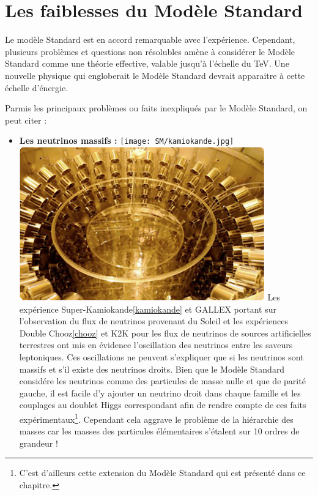 \section{Les faiblesses du Modèle Standard}
Le modèle Standard est en accord remarquable avec l'expérience. Cependant, plusieurs problèmes et questions non résolubles amène à considérer le Modèle Standard comme une théorie effective, valable jusqu'à l'échelle du TeV. Une nouvelle physique qui engloberait le Modèle Standard devrait apparaitre à cette échelle d'énergie.

Parmis les principaux problèmes ou faits inexpliqués par le Modèle Standard, on peut citer :
\begin{itemize}[label=$\bullet$]
\item \textbf{Les neutrinos massifs :}
\marginpar
{
\centering
\texttt{[image: SM/kamiokande.jpg]}
\label{kamiokande}
}
\marginpar
{
\centering
\includegraphics[width=\marginparwidth]{SM/chooz.jpg}
\label{chooz}
} 
Les expérience Super-Kamiokande\ref{kamiokande} et GALLEX portant sur l'observation du flux de neutrinos provenant du Soleil et les expériences Double Chooz\ref{chooz} et K2K pour les flux de neutrinos de sources artificielles terrestres ont mis en évidence l'oscillation des neutrinos entre les saveurs leptoniques. Ces oscillations ne peuvent s'expliquer que si les neutrinos sont massifs et s'il existe des neutrinos droits. Bien que le Modèle Standard considére les neutrinos comme des particules de masse nulle et que de parité gauche, il est facile d'y ajouter un neutrino droit dans chaque famille et les couplages au doublet Higgs correspondant afin de rendre compte de ces faits expérimentaux\footnote{C'est d'ailleurs cette extension du Modèle Standard qui est présenté dans ce chapitre.}. Cependant cela aggrave le problème de la hiérarchie des masses car les masses des particules élémentaires s'étalent sur 10 ordres de grandeur !


\end{itemize}
